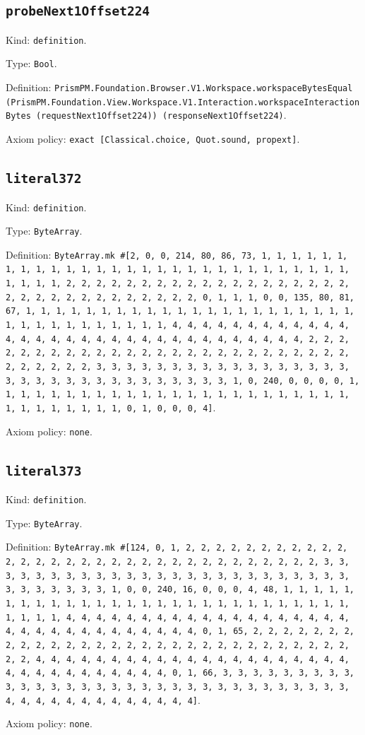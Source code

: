 \documentclass[11pt]{article}
\begin{document}
\subsection*{\texttt{probeNext1Offset224}}
\noindent Kind: \texttt{definition}.\par
\noindent Type: \texttt{Bool}.\par
\noindent Definition: \texttt{PrismPM.Foundation.Browser.V1.Workspace.workspaceBytesEqual (PrismPM.Foundation.View.Workspace.V1.Interaction.workspaceInteractionBytes (requestNext1Offset224)) (responseNext1Offset224)}.\par
\noindent Axiom policy: \texttt{exact [Classical.choice, Quot.sound, propext]}.\par
\subsection*{\texttt{literal372}}
\noindent Kind: \texttt{definition}.\par
\noindent Type: \texttt{ByteArray}.\par
\noindent Definition: \texttt{ByteArray.mk \#[2, 0, 0, 214, 80, 86, 73, 1, 1, 1, 1, 1, 1, 1, 1, 1, 1, 1, 1, 1, 1, 1, 1, 1, 1, 1, 1, 1, 1, 1, 1, 1, 1, 1, 1, 1, 1, 1, 1, 1, 2, 2, 2, 2, 2, 2, 2, 2, 2, 2, 2, 2, 2, 2, 2, 2, 2, 2, 2, 2, 2, 2, 2, 2, 2, 2, 2, 2, 2, 2, 2, 2, 0, 1, 1, 1, 0, 0, 135, 80, 81, 67, 1, 1, 1, 1, 1, 1, 1, 1, 1, 1, 1, 1, 1, 1, 1, 1, 1, 1, 1, 1, 1, 1, 1, 1, 1, 1, 1, 1, 1, 1, 1, 1, 1, 4, 4, 4, 4, 4, 4, 4, 4, 4, 4, 4, 4, 4, 4, 4, 4, 4, 4, 4, 4, 4, 4, 4, 4, 4, 4, 4, 4, 4, 4, 4, 4, 2, 2, 2, 2, 2, 2, 2, 2, 2, 2, 2, 2, 2, 2, 2, 2, 2, 2, 2, 2, 2, 2, 2, 2, 2, 2, 2, 2, 2, 2, 2, 2, 3, 3, 3, 3, 3, 3, 3, 3, 3, 3, 3, 3, 3, 3, 3, 3, 3, 3, 3, 3, 3, 3, 3, 3, 3, 3, 3, 3, 3, 3, 3, 3, 1, 0, 240, 0, 0, 0, 0, 1, 1, 1, 1, 1, 1, 1, 1, 1, 1, 1, 1, 1, 1, 1, 1, 1, 1, 1, 1, 1, 1, 1, 1, 1, 1, 1, 1, 1, 1, 1, 1, 0, 1, 0, 0, 0, 4]}.\par
\noindent Axiom policy: \texttt{none}.\par
\subsection*{\texttt{literal373}}
\noindent Kind: \texttt{definition}.\par
\noindent Type: \texttt{ByteArray}.\par
\noindent Definition: \texttt{ByteArray.mk \#[124, 0, 1, 2, 2, 2, 2, 2, 2, 2, 2, 2, 2, 2, 2, 2, 2, 2, 2, 2, 2, 2, 2, 2, 2, 2, 2, 2, 2, 2, 2, 2, 2, 2, 2, 3, 3, 3, 3, 3, 3, 3, 3, 3, 3, 3, 3, 3, 3, 3, 3, 3, 3, 3, 3, 3, 3, 3, 3, 3, 3, 3, 3, 3, 3, 3, 3, 1, 0, 0, 240, 16, 0, 0, 0, 4, 48, 1, 1, 1, 1, 1, 1, 1, 1, 1, 1, 1, 1, 1, 1, 1, 1, 1, 1, 1, 1, 1, 1, 1, 1, 1, 1, 1, 1, 1, 1, 1, 1, 4, 4, 4, 4, 4, 4, 4, 4, 4, 4, 4, 4, 4, 4, 4, 4, 4, 4, 4, 4, 4, 4, 4, 4, 4, 4, 4, 4, 4, 4, 4, 4, 0, 1, 65, 2, 2, 2, 2, 2, 2, 2, 2, 2, 2, 2, 2, 2, 2, 2, 2, 2, 2, 2, 2, 2, 2, 2, 2, 2, 2, 2, 2, 2, 2, 2, 2, 4, 4, 4, 4, 4, 4, 4, 4, 4, 4, 4, 4, 4, 4, 4, 4, 4, 4, 4, 4, 4, 4, 4, 4, 4, 4, 4, 4, 4, 4, 4, 4, 0, 1, 66, 3, 3, 3, 3, 3, 3, 3, 3, 3, 3, 3, 3, 3, 3, 3, 3, 3, 3, 3, 3, 3, 3, 3, 3, 3, 3, 3, 3, 3, 3, 3, 3, 4, 4, 4, 4, 4, 4, 4, 4, 4, 4, 4, 4, 4]}.\par
\noindent Axiom policy: \texttt{none}.\par
\end{document}
